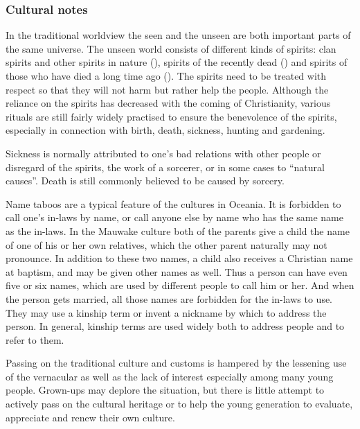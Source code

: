 \subsubsection{Cultural notes} 
In the traditional worldview the seen and the unseen are both important parts of the same universe.  The unseen world consists of different kinds of spirits: clan spirits and other spirits in nature (), spirits of the recently dead () and spirits of those who have died a long time ago (). The spirits need to be treated with respect so that they will not harm but rather help the people.  Although the reliance on the spirits has decreased with the coming of Christianity, various rituals are still fairly widely practised to ensure the benevolence of the spirits, especially in connection with birth, death, sickness, hunting and gardening. 

Sickness is normally attributed to one's bad relations with other people or disregard of the spirits, the work of a sorcerer, or in some cases to ``natural causes''. Death is still commonly believed to be caused by sorcery.

Name taboos are a typical feature of the cultures in Oceania.  It is forbidden to call one's in-laws by name, or call anyone else by name who has the same name as the in-laws.  In the Mauwake culture both of the parents give a child the name of one of his or her own relatives, which the other parent naturally may not pronounce.  In addition to these two names, a child also receives a Christian name at baptism, and may be given other names as well.  Thus a person can have even five or six names, which are used by different people to call him or her.  And when the person gets married, all those names are forbidden for the in-laws to use.  They may use a kinship term or invent a nickname by which to address the person. In general, kinship terms are used widely both to address people and to refer to them.

Passing on the traditional culture and customs is hampered by the lessening use of the vernacular as well as the lack of interest especially among many young people. Grown-ups may deplore the situation, but there is little attempt to actively pass on the cultural heritage or to help the young generation to evaluate, appreciate and renew their own culture. 



